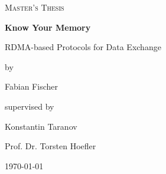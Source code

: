 \documentclass{article}
\theoremstyle{plain}
\theoremstyle{definition}
\theoremstyle{remark}
\begin{document}
\iffalse
\fi
\newcommand{\seqnode}[3][]{ 
  \node[#1] (#2) {#3};
  \node[below of=#2, node distance=5cm] (#2_g) {};
  \draw (#2) -- (#2_g);
}
\newcommand{\hseqnode}[3][]{ 
  \node[#1] (#2) {#3};
  \node[below of=#2, node distance=5cm] (#2_g) {};
}
\newcommand{\msg}[5][above]{
  \draw[->] ($(#2)!#4!(#2_g)$) -- node[#1,scale=0.75,midway]{#5} ($(#3)!#4+0.04!(#3_g)$);
}
\newcommand{\fetch}[4]{
  \draw[-] ($(#1)!#3-0.04!(#1_g)$) -- node[above,scale=0.75,midway]{#4} ($(#2)!#3!(#2_g)$);
  \draw[->] ($(#2)!#3!(#2_g)$) -- node[above,scale=0.75,midway]{} ($(#1)!#3+0.04!(#1_g)$);
}

\newcommand{\queue}[2][]{ 
  \draw (#2) -- ++(2cm,0) -- ++(0,-1cm) -- ++(-2cm,0);
  \foreach \i in {1,...,4} \draw (#2)++(2cm-\i*3mm,0) -- +(0,-1cm);
  \node[align=center, , xshift = 1cm, yshift = .15cm] at (#2) {#1};
}

\newcommand{\rqueue}[2][]{ 
  \draw (#2) -- ++(2cm,0);
  \draw (#2) -- ++(0,-1cm) -- ++(2cm,0);
  \foreach \i in {1,...,4} \draw (#2)++(\i*3mm,0) -- +(0,-1cm);
  \node[align=center, , xshift = 1cm, yshift = .15cm] at (#2) {#1};
}


\begin{titlepage}
	\centering
	{\scshape\Large Master's Thesis\par}
	\vspace{1.5cm}
  {\huge\bfseries Know Your Memory\par}
  {\Large RDMA-based Protocols for Data Exchange\par}
	\vspace{2cm}
	{\Large by \par Fabian Fischer\par}
	\vfill
	supervised by\par
	Konstantin Taranov\par
  Prof. Dr. Torsten Hoefler

	\vfill

	{\large \today\par}
\end{titlepage}

 
\tableofcontents
\pagebreak


\pagebreak


\pagebreak




\pagebreak

\pagebreak


\pagebreak


\pagebreak


\pagebreak



\pagebreak


\pagebreak



\pagebreak


\pagebreak


\pagebreak



\pagebreak


{}



\end{document}

